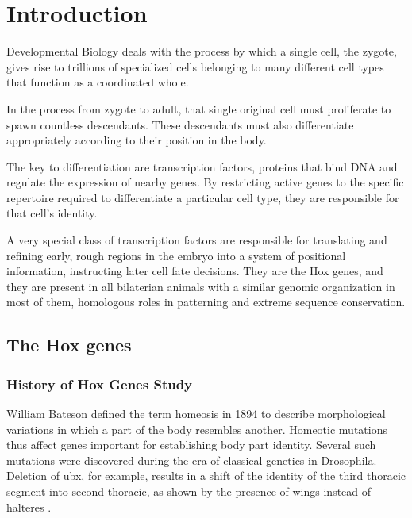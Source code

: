 \chapter{Introduction}
\label{chp:intro}

Developmental Biology deals with the process by which a single cell, the zygote, gives rise to trillions of specialized cells belonging to many different cell types that function as a coordinated whole.

In the process from zygote to adult, that single original cell must proliferate to spawn countless descendants. These descendants must also differentiate appropriately according to their position in the body. 

The key to differentiation are transcription factors, proteins that bind DNA and regulate the expression of nearby genes. By restricting active genes to the specific repertoire required to differentiate a particular cell type, they are responsible for that cell's identity. 

A very special class of transcription factors are responsible for translating and refining early, rough regions in the embryo into a system of positional information, instructing later cell fate decisions. They are the Hox genes, and they are present in all bilaterian animals with a similar genomic organization in most of them, homologous roles in patterning and extreme sequence conservation.%

\section{The Hox genes}

\subsection{History of Hox Genes Study}

William Bateson defined the term homeosis in 1894 to describe morphological variations in which a part of the body resembles another. Homeotic mutations thus affect genes important for establishing body part identity. Several such mutations were discovered during the era of classical genetics in Drosophila. Deletion of \ac{ubx}, for example, results in a shift of the identity of the third thoracic segment into second thoracic, as shown by the presence of wings instead of halteres \parencite{Morata1981}.


